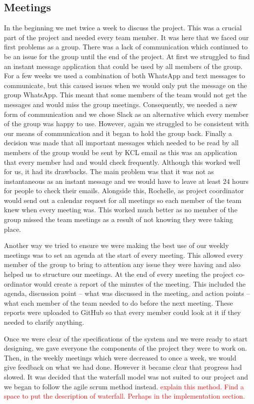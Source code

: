\documentclass{article}
\begin{document}
	\subsection{Meetings}
	In the beginning we met twice a week to discuss the project. 
	This was a crucial part of the project and needed every team member. 
	It was here that we faced our first problems as a group. 
	There was a lack of communication which continued to be an issue for the group until the end of the project. 
	At first we struggled to find an instant message application that could be used by all members of the group. 
	For a few weeks we used a combination of both WhatsApp and text messages to communicate, but this caused issues when we would only put the message on the group WhatsApp. 
	This meant that some members of the team would not get the messages and would miss the group meetings. 
	Consequently, we needed a new form of communication and we chose Slack as an alternative which every member of the group was happy to use. 
	However, again we struggled to be consistent with our means of communication and it began to hold the group back. 
	Finally a decision was made that all important messages which needed to be read by all members of the group would be sent by KCL email as this was an application that every member had and would check frequently. 
	Although this worked well for us, it had its drawbacks. 
	The main problem was that it was not as instantaneous as an instant message and we would have to leave at least 24 hours for people to check their emails. 
	Alongside this, Rochelle, as project coordinator would send out a calendar request for all meetings so each member of the team knew when every meeting was. 
	This worked much better as no member of the group missed the team meetings as a result of not knowing they were taking place. 
	
	Another way we tried to ensure we were making the best use of our weekly meetings was to set an agenda at the start of every meeting. 
	This allowed every member of the group to bring to attention any issue they were having and also helped us to structure our meetings. 
	At the end of every meeting the project co-ordinator would create a report of the minutes of the meeting. This included the agenda, discussion point -- what was discussed in the meeting, and action points -- what each member of the team needed to do before the next meeting. 
	These reports were uploaded to GitHub so that every member could look at it if they needed to clarify anything.
	
	Once we were clear of the specifications of the system and we were ready to start designing, we gave everyone the components of the project they were to work on. Then, in the weekly meetings which were decreased to once a week, we would give feedback on what we had done. However it became clear that progress had slowed. It was decided that the waterfall model was not suited to our project and we began to follow the agile scrum method instead. \textcolor{red}{explain this method. Find a space to put the description of waterfall. Perhaps in the implementation section.}
	
\end{document}
